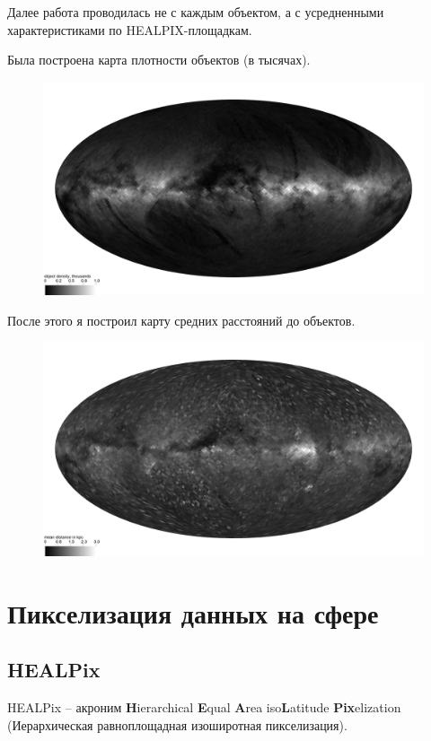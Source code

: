 \documentclass[14pt]{article} %
\begin{document}
Далее работа проводилась не с каждым объектом, а с усредненными характеристиками по HEALPIX-площадкам.

Была построена карта плотности объектов (в тысячах).
\begin{figure}[h!]
\includegraphics[width=1\linewidth]{healpdens.jpg}
\end{figure}\newpage

После этого я построил карту средних расстояний до объектов.
\begin{figure}[h!]
\includegraphics[width=1\linewidth]{healpdistmap.jpg}
\end{figure}

\section{Пикселизация данных на сфере}

\subsection{HEALPix}
HEALPix -- акроним \textbf{H}ierarchical \textbf{E}qual \textbf{A}rea iso\textbf{L}atitude \textbf{Pix}elization (Иерархическая равноплощадная изоширотная пикселизация).
\end{document}
